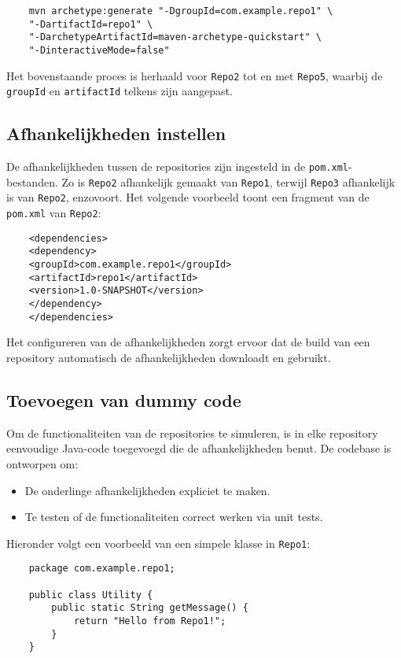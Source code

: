 \begin{verbatim}
    mvn archetype:generate "-DgroupId=com.example.repo1" \
    "-DartifactId=repo1" \
    "-DarchetypeArtifactId=maven-archetype-quickstart" \
    "-DinteractiveMode=false"
\end{verbatim}


Het bovenstaande proces is herhaald voor \texttt{Repo2} tot en met \texttt{Repo5}, waarbij de \texttt{groupId} en \texttt{artifactId} telkens zijn aangepast.

\subsection{Afhankelijkheden instellen}
De afhankelijkheden tussen de repositories zijn ingesteld in de \texttt{pom.xml}-bestanden. Zo is \texttt{Repo2} afhankelijk gemaakt van \texttt{Repo1}, terwijl \texttt{Repo3} afhankelijk is van \texttt{Repo2}, enzovoort. Het volgende voorbeeld toont een fragment van de \texttt{pom.xml} van \texttt{Repo2}:

\begin{verbatim}
    <dependencies>
    <dependency>
    <groupId>com.example.repo1</groupId>
    <artifactId>repo1</artifactId>
    <version>1.0-SNAPSHOT</version>
    </dependency>
    </dependencies>
\end{verbatim}

Het configureren van de afhankelijkheden zorgt ervoor dat de build van een repository automatisch de afhankelijkheden downloadt en gebruikt.

\subsection{Toevoegen van dummy code}
Om de functionaliteiten van de repositories te simuleren, is in elke repository eenvoudige Java-code toegevoegd die de afhankelijkheden benut. De codebase is ontworpen om:
\begin{itemize}
    \item De onderlinge afhankelijkheden expliciet te maken.
    \item Te testen of de functionaliteiten correct werken via unit tests.
\end{itemize}

Hieronder volgt een voorbeeld van een simpele klasse in \texttt{Repo1}:

\begin{verbatim}
    package com.example.repo1;
    
    public class Utility {
        public static String getMessage() {
            return "Hello from Repo1!";
        }
    }
\end{verbatim}

